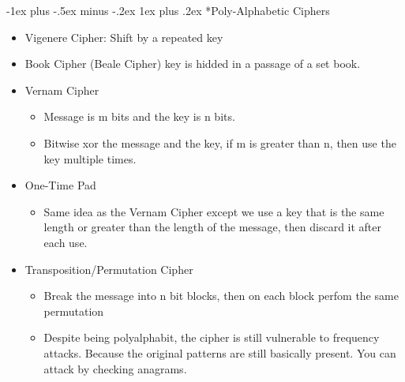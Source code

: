 \documentclass[3pt,landscape]{article}
\makeatletter
\renewcommand{\subsubsection}{\@startsection{subsubsection}{3}{0mm}%
                            {-1ex plus -.5ex minus -.2ex}%
                            {1ex plus .2ex}%
                            {\normalfont\small\bfseries}}
\makeatother
\begin{document}
\begin{multicols}{3}
\subsubsection*{Poly-Alphabetic Ciphers}
\begin{itemize}
    \item Vigenere Cipher: Shift by a repeated key
    \item Book Cipher (Beale Cipher) key is hidded in a passage of a set book.
    \item Vernam Cipher
        \begin{itemize}
            \item Message is m bits and the key is n bits.
            \item Bitwise xor the message and the key, if m is greater than n, then use the key multiple times.
        \end{itemize}
    \item One-Time Pad
        \begin{itemize}
            \item Same idea as the Vernam Cipher except we use a key that is the same length or greater than the length of the message, then discard it after each use.
        \end{itemize}
    \item Transposition/Permutation Cipher
        \begin{itemize}
            \item Break the message into n bit blocks, then on each block perfom the same permutation
            \item Despite being polyalphabit, the cipher is still vulnerable to frequency attacks. Because the original patterns are still basically present. You can attack by checking anagrams.
        \end{itemize}
\end{itemize}


\end{multicols}
\end{document}
